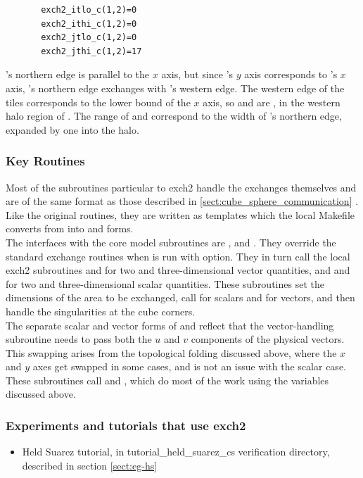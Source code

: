 \begin{verbatim}
       exch2_itlo_c(1,2)=0
       exch2_ithi_c(1,2)=0
       exch2_jtlo_c(1,2)=0
       exch2_jthi_c(1,2)=17
\end{verbatim}
 
's northern edge is parallel to the $x$ axis, but since
's $y$ axis corresponds to 's $x$ axis, 's
northern edge exchanges with 's western edge.  The western
edge of the tiles corresponds to the lower bound of the $x$ axis, so
 and  are , in the 
western halo region of . The range of
 and  correspond to the
width of 's northern edge, expanded by one into the halo. \\


\subsubsection{Key Routines}

Most of the subroutines particular to exch2 handle the exchanges
themselves and are of the same format as those described in
\ref{sect:cube_sphere_communication} .  Like the original routines, they are written as
templates which the local Makefile converts from  into 
 and  forms. \\

The interfaces with the core model subroutines are
,  and
.  They override the standard exchange routines
when  is run with  option.  They in turn
call the local exch2 subroutines  and
 for two and three-dimensional vector
quantities, and  and  for two
and three-dimensional scalar quantities.  These subroutines set the
dimensions of the area to be exchanged, call 
for scalars and  for vectors, and then handle
the singularities at the cube corners. \\

The separate scalar and vector forms of  and
 reflect that the vector-handling subroutine
needs to pass both the $u$ and $v$ components of the physical vectors.
This swapping arises from the topological folding discussed above, where the
$x$ and $y$ axes get swapped in some cases, and is not an
issue with the scalar case. These subroutines call
 and , which do most of
the work using the variables discussed above. \\

\subsubsection{Experiments and tutorials that use exch2}
\label{sec:pkg:exch2:experiments}

\begin{itemize}
\item{Held Suarez tutorial, in tutorial\_held\_suarez\_cs verification directory, 
described in section \ref{sect:eg-hs} }
\end{itemize}
